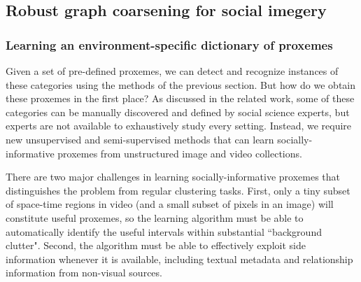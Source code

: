 
\subsection{Robust graph coarsening for social imegery}
\label{sec:actlearn}
\vspace{-5pt}
\subsubsection{Learning an environment-specific dictionary of proxemes}

Given a set of pre-defined proxemes, we can detect and recognize instances of these categories using the methods of the previous section. But how do we obtain these proxemes in the first place? 
As discussed in the related work, some of these categories can be manually discovered and defined by social science experts, but experts are not available to exhaustively study every setting. Instead, we require new unsupervised and semi-supervised methods that can learn socially-informative proxemes from unstructured image and video collections.

There are two major challenges in learning socially-informative proxemes that distinguishes the problem from regular clustering tasks. First, only a tiny subset of space-time regions in video (and a small subset of pixels in an image) will constitute useful proxemes, so the learning algorithm must be able to automatically identify the useful intervals within substantial ``background clutter". Second, the algorithm must be able to effectively exploit side information whenever it is available, including textual metadata and relationship information from non-visual sources. 



